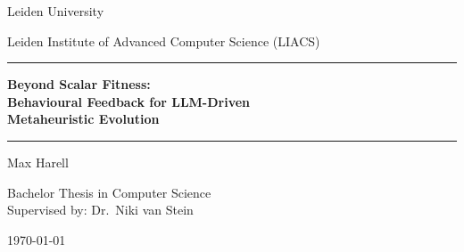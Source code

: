 %
%

\begin{titlepage}
\centering

\vspace*{2cm}

{\Large Leiden University \par}
{\large Leiden Institute of Advanced Computer Science (LIACS) \par}

\vspace{2cm}

\rule{\textwidth}{0.4pt}\par
\vspace{0.8cm}
{\LARGE \bfseries Beyond Scalar Fitness: \\ Behavioural Feedback for LLM-Driven \\ Metaheuristic Evolution \par}
\vspace{0.8cm}
\rule{\textwidth}{0.4pt}

\vspace{2cm}

{\Large Max Harell \par}

\vspace{1.5cm}

{\large
Bachelor Thesis in Computer Science \\[1em]
Supervised by: Dr.\ Niki van Stein
\par}

\vfill

{\large \today \par}

\end{titlepage}
